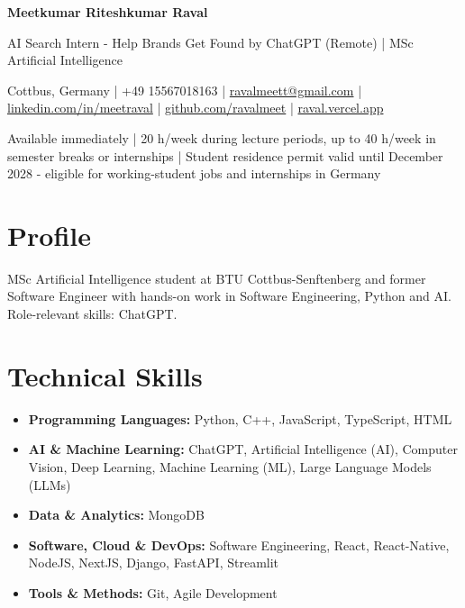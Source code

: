 \documentclass[a4paper,10pt]{article}
\begin{document}
\begin{center}
  {\LARGE\bfseries Meetkumar Riteshkumar Raval}\par\vspace{3pt}
  {\large AI Search Intern - Help Brands Get Found by ChatGPT (Remote) | MSc Artificial Intelligence}\par\vspace{3pt}
  {\small Cottbus, Germany | +49 15567018163 | \href{mailto:ravalmeett@gmail.com}{ravalmeett@gmail.com} | \href{https://www.linkedin.com/in/meetraval/}{linkedin.com/in/meetraval} | \href{https://github.com/ravalmeet}{github.com/ravalmeet} | \href{https://raval.vercel.app/}{raval.vercel.app}}\par\vspace{2pt}
  {\small Available immediately | 20 h/week during lecture periods, up to 40 h/week in semester breaks or internships | Student residence permit valid until December 2028 - eligible for working-student jobs and internships in Germany}\par
\end{center}

\section*{Profile}
MSc Artificial Intelligence student at BTU Cottbus-Senftenberg and former Software Engineer with hands-on work in Software Engineering, Python and AI. Role-relevant skills: ChatGPT.\par

\section*{Technical Skills}
\begin{itemize}
\item \textbf{Programming Languages:} Python, C++, JavaScript, TypeScript, HTML
\item \textbf{AI \& Machine Learning:} ChatGPT, Artificial Intelligence (AI), Computer Vision, Deep Learning, Machine Learning (ML), Large Language Models (LLMs)
\item \textbf{Data \& Analytics:} MongoDB
\item \textbf{Software, Cloud \& DevOps:} Software Engineering, React, React-Native, NodeJS, NextJS, Django, FastAPI, Streamlit
\item \textbf{Tools \& Methods:} Git, Agile Development
\end{itemize}
\end{document}
